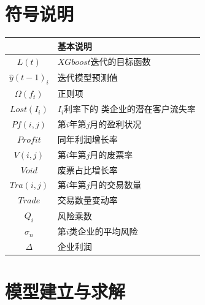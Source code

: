 \documentclass[UTF8]{ctexart}
\begin{document}
\section{符号说明}
\begin{table}[H]
	\begin{center}
		\begin{tabular}{c|l}
			\toprule[2pt]
			\rowcolor[gray]{0.8}

			\multicolumn{1}{m{8em}}{\centering 符号} & \multicolumn{1}{m{30em}}{\centering 基本说明}        \\


			\midrule[1.3pt]
			$L(t)$                                   & $XGboost$迭代的目标函数                        \\   
			$\hat{y}(t-1)_i$                         & 迭代模型预测值                      \\
			$\Omega (f_t)$                           & 正则项               \\
			$Lost(I_i)$                              & $I_i$利率下的 类企业的潜在客户流失率 \\
			$Pf(i,j)$                            	& 第$i$年第$j$月的盈利状况                 \\
			$Profit$                                 & 同年利润增长率       \\
			$V(i,j)$                                & 第$i$年第$j$月的废票率                 \\
			$Void$                                 & 废票占比增长率                     \\
			$Tra(i,j)$                                 & 第$i$年第$j$月的交易数量                \\
			$Trade$                                   & 交易数量变动率                 \\
			$Q_i$								&风险乘数 \\
			$\sigma _n$							&第$i$类企业的平均风险 \\
			$\Delta $								& 企业利润 \\                            
			\bottomrule[2pt]
		\end{tabular}
	\end{center}
\end{table}



\section{模型建立与求解}
\end{document}
